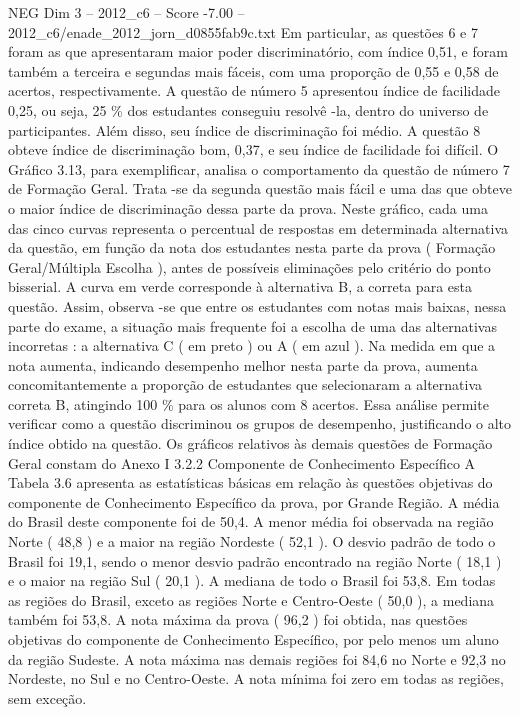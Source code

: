 \begin{textsample}{NEG Dim 3 – 2012\_c6 – Score -7.00 – 2012\_c6/enade\_2012\_jorn\_d0855fab9c.txt}
Em particular, as questões 6 e 7 foram as que apresentaram maior poder discriminatório, com índice 0,51, e foram também a terceira e segundas mais fáceis, com uma proporção de 0,55 e 0,58 de acertos, respectivamente.
A questão de número 5 apresentou índice de facilidade 0,25, ou seja, 25 \% dos estudantes conseguiu resolvê -la, dentro do universo de participantes.
Além disso, seu índice de discriminação foi médio.
A questão 8 obteve índice de discriminação bom, 0,37, e seu índice de facilidade foi difícil.
O Gráfico 3.13, para exemplificar, analisa o comportamento da questão de número 7 de Formação Geral.
Trata -se da segunda questão mais fácil e uma das que obteve o maior índice de discriminação dessa parte da prova.
Neste gráfico, cada uma das cinco curvas representa o percentual de respostas em determinada alternativa da questão, em função da nota dos estudantes nesta parte da prova ( Formação Geral/Múltipla Escolha ), antes de possíveis eliminações pelo critério do ponto bisserial.
A curva em verde corresponde à alternativa B, a correta para esta questão.
Assim, observa -se que entre os estudantes com notas mais baixas, nessa parte do exame, a situação mais frequente foi a escolha de uma das alternativas incorretas : a alternativa C ( em preto ) ou A ( em azul ).
Na medida em que a nota aumenta, indicando desempenho melhor nesta parte da prova, aumenta concomitantemente a proporção de estudantes que selecionaram a alternativa correta B, atingindo 100 \% para os alunos com 8 acertos.
Essa análise permite verificar como a questão discriminou os grupos de desempenho, justificando o alto índice obtido na questão.
Os gráficos relativos às demais questões de Formação Geral constam do Anexo I 3.2.2 Componente de Conhecimento Específico A Tabela 3.6 apresenta as estatísticas básicas em relação às questões objetivas do componente de Conhecimento Específico da prova, por Grande Região.
A média do Brasil deste componente foi de 50,4.
A menor média foi observada na região Norte ( 48,8 ) e a maior na região Nordeste ( 52,1 ).
O desvio padrão de todo o Brasil foi 19,1, sendo o menor desvio padrão encontrado na região Norte ( 18,1 ) e o maior na região Sul ( 20,1 ).
A mediana de todo o Brasil foi 53,8.
Em todas as regiões do Brasil, exceto as regiões Norte e Centro-Oeste ( 50,0 ), a mediana também foi 53,8.
A nota máxima da prova ( 96,2 ) foi obtida, nas questões objetivas do componente de Conhecimento Específico, por pelo menos um aluno da região Sudeste.
A nota máxima nas demais regiões foi 84,6 no Norte e 92,3 no Nordeste, no Sul e no Centro-Oeste.
A nota mínima foi zero em todas as regiões, sem exceção.

\end{textsample}
